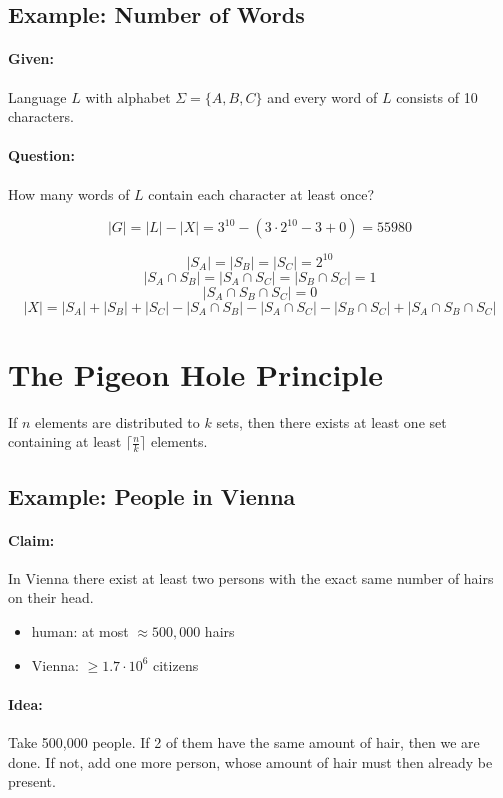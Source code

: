 \documentclass[11pt]{article}
\begin{document}
\subsection{Example: Number of Words}

\paragraph{Given:} Language $ L $ with alphabet $ \Sigma = \{ A, B, C \} $ and every word of $ L $ consists of 10 characters.

\paragraph{Question:} How many words of $ L $ contain each character at least once?

\[ | G | = | L | - | X | = 3^{10} - (3 \cdot 2^{10} - 3 + 0) = 55980 \]

\[ | S_A | = | S_B | = | S_C | = 2^{10} \]
\[ | S_A \cap S_B | = | S_A \cap S_C | = | S_B \cap S_C | = 1 \]
\[ | S_A \cap S_B \cap S_C | = 0 \]
\[ | X | = | S_A | + | S_B | + | S_C | - | S_A \cap S_B |  - | S_A \cap S_C | - | S_B \cap S_C | + | S_A \cap S_B \cap S_C | \]

\section{The Pigeon Hole Principle}

If $ n $ elements are distributed to $ k $ sets, then there exists at least one set containing at least $ \lceil \frac{n}{k} \rceil $ elements.

\subsection{Example: People in Vienna}

\paragraph{Claim:} In Vienna there exist at least two persons with the exact same number of hairs on their head.

\begin{itemize}
\item human: at most $ \approx 500,000 $ hairs
\item Vienna: $ \geq 1.7 \cdot 10^6 $ citizens
\end{itemize}

\paragraph{Idea:} Take 500,000 people. If 2 of them have the same amount of hair, then we are done. If not, add one more person, whose amount of hair must then already be present.
\end{document}
